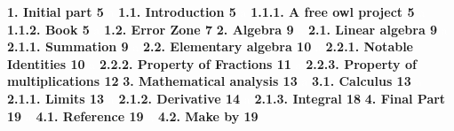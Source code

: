 \documentclass{book}
\begin{document}
        \textbf{1. Initial part \hspace{10cm} 5}
            \textcolor{white}{a} \hspace{1cm} \textbf{1.1. Introduction \hspace{8.14cm}5}
                \textcolor{white}{a} \hspace{2cm} \textbf{1.1.1. A free owl project \hspace{6cm}5}
                \textcolor{white}{a} \hspace{2cm} \textbf{1.1.2. Book  \hspace{8.15cm}5}
            \textcolor{white}{a} \hspace{1cm} \textbf{1.2. Error Zone \hspace{8.49cm}7}
        \textbf{2. Algebra \hspace{10.55cm} 9}
            \textcolor{white}{a} \hspace{1cm} \textbf{2.1. Linear algebra \hspace{7.9cm}9}
                \textcolor{white}{a} \hspace{2cm} \textbf{2.1.1. Summation \hspace{7.05cm}9}
            \textcolor{white}{a} \hspace{1cm} \textbf{2.2. Elementary algebra \hspace{6.9cm} 10}
                \textcolor{white}{a} \hspace{2cm} \textbf{2.2.1. Notable Identities \hspace{5.85cm} 10}
                \textcolor{white}{a} \hspace{2cm} \textbf{2.2.2. Property of Fractions \hspace{5.27cm} 11}
                \textcolor{white}{a} \hspace{2cm} \textbf{2.2.3. Property of multiplications \hspace{4.3cm} 12}
        \textbf{3. Mathematical analysis \hspace{8.05cm} 13}
            \textcolor{white}{a} \hspace{1cm} \textbf{3.1. Calculus \hspace{8.9cm}13}
                \textcolor{white}{a} \hspace{2cm} \textbf{2.1.1. Limits \hspace{7.95cm}13}
                \textcolor{white}{a} \hspace{2cm} \textbf{2.1.2. Derivative \hspace{7.25cm}14}
                \textcolor{white}{a} \hspace{2cm} \textbf{2.1.3. Integral \hspace{7.65cm}18}
        \textbf{4. Final Part \hspace{10.25cm}19}
            \textcolor{white}{a} \hspace{1cm} \textbf{4.1. Reference \hspace{8.65cm}19}
            \textcolor{white}{a} \hspace{1cm} \textbf{4.2. Make by \hspace{8.9cm}19}
\end{document}

